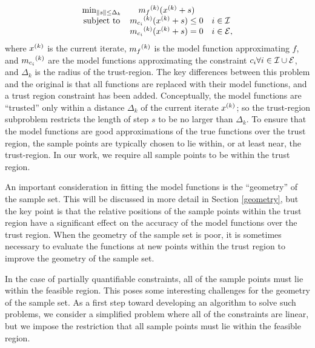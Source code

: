 \[ \begin{array}{ccl} \min_{\| s \| \le \Delta_k}
 & {{m}_f}^{(k)} ({x}^{(k)}+s) \\
\mbox{subject to} & {{m}_{c_i}}^{(k)}({x}^{(k)} + s) \le 0 & i \in \mathcal{I} \\
& {{m}_{c_i}}^{(k)}({x}^{(k)} + s) = 0 & i \in \mathcal{E},
\end{array}
\]
where ${x}^{(k)}$ is the current iterate, ${{m}_f}^{(k)}$ is the model function approximating $f$,  and ${{m}_{c_i}}^{(k)}$ are the model functions approximating the constraint $c_i \forall i \in \mathcal{I} \cup \mathcal{E}$, and $\Delta_k$ is the radius of the trust-region.
The key differences between this problem and the original is that all functions are replaced with their model functions, and a trust region constraint has been added.
Conceptually, the model functions are ``trusted'' only within a distance $\Delta_k$ of the current iterate ${x}^{(k)}$; so the trust-region subproblem restricts the length of step $s$ to be no larger than $\Delta_k$.
To ensure that the model functions are good approximations of the true functions over the trust region, the sample points are typically chosen to lie within, or at least near, the trust-region.
In our work, we require all sample points to be within the trust region.


An important consideration in fitting the model functions is the ``geometry'' of the sample set.
This will be discussed in more detail in Section \ref{geometry}, but the key point is that the relative positions of the sample points within the trust region have a significant effect on the accuracy of the model functions over the trust region.
When the geometry of the sample set is poor, it is sometimes necessary to evaluate the functions at new points within the trust region to improve the geometry of the sample set.

In the case of partially quantifiable constraints, all of the sample points must lie within the feasible region.
This poses some interesting challenges for the geometry of the sample set.
As a first step toward developing an algorithm to solve such problems, we consider a simplified problem where all of the constraints are linear, but we impose the restriction that all sample points must lie within the feasible region.

  

